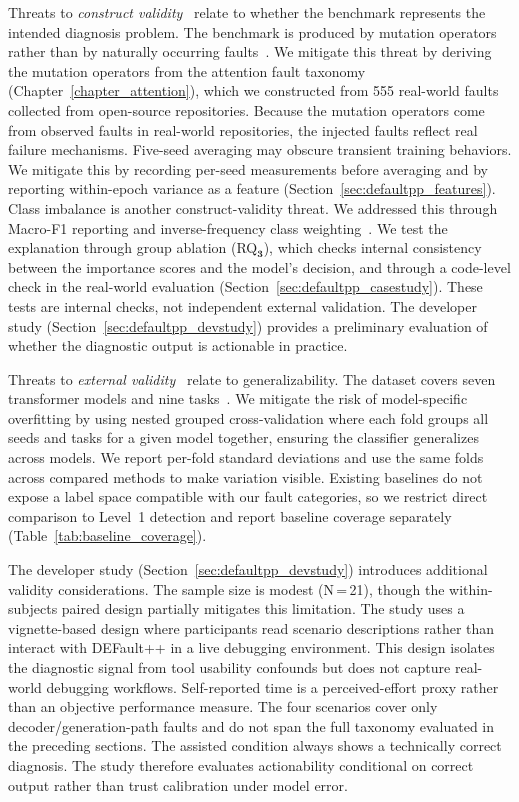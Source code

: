 Threats to \emph{construct validity}~\cite{wohlin2012experimentation} relate to whether the benchmark represents the intended diagnosis problem. The benchmark is produced by mutation operators rather than by naturally occurring faults~\cite{attention_taxonomy,frankenformer}. We mitigate this threat by deriving the mutation operators from the attention fault taxonomy (Chapter~\ref{chapter_attention}), which we constructed from 555 real-world faults collected from open-source repositories. Because the mutation operators come from observed faults in real-world repositories, the injected faults reflect real failure mechanisms. Five-seed averaging may obscure transient training behaviors. We mitigate this by recording per-seed measurements before averaging and by reporting within-epoch variance as a feature (Section~\ref{sec:defaultpp_features}). Class imbalance is another construct-validity threat. We addressed this through Macro-F1 reporting and inverse-frequency class weighting~\cite{buda2018systematic}. We test the explanation through group ablation (RQ$\mathbf{_3}$), which checks internal consistency between the importance scores and the model's decision, and through a code-level check in the real-world evaluation (Section~\ref{sec:defaultpp_casestudy}). These tests are internal checks, not independent external validation. The developer study (Section~\ref{sec:defaultpp_devstudy}) provides a preliminary evaluation of whether the diagnostic output is actionable in practice.

Threats to \emph{external validity}~\cite{wohlin2012experimentation} relate to generalizability. The dataset covers seven transformer models and nine tasks~\cite{frankenformer}. We mitigate the risk of model-specific overfitting by using nested grouped cross-validation where each fold groups all seeds and tasks for a given model together, ensuring the classifier generalizes across models. We report per-fold standard deviations and use the same folds across compared methods to make variation visible. Existing baselines do not expose a label space compatible with our fault categories, so we restrict direct comparison to Level~1 detection and report baseline coverage separately (Table~\ref{tab:baseline_coverage}).

The developer study (Section~\ref{sec:defaultpp_devstudy}) introduces additional validity considerations. The sample size is modest (N\,=\,21), though the within-subjects paired design partially mitigates this limitation. The study uses a vignette-based design where participants read scenario descriptions rather than interact with DEFault++ in a live debugging environment. This design isolates the diagnostic signal from tool usability confounds but does not capture real-world debugging workflows. Self-reported time is a perceived-effort proxy rather than an objective performance measure. The four scenarios cover only decoder/generation-path faults and do not span the full taxonomy evaluated in the preceding sections. The assisted condition always shows a technically correct diagnosis. The study therefore evaluates actionability conditional on correct output rather than trust calibration under model error.


